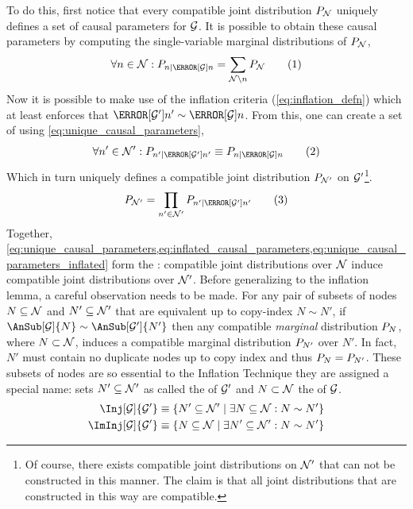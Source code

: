 \documentclass[aps, 10pt, english, twoside, pra, nofootinbib, tightenlines, longbibliography]{revtex4-1}
\begin{document}
    To do this, first notice that every compatible joint distribution $\prob[\nodes]$ uniquely defines a set of causal parameters for $\mathcal{G}$. It is possible to obtain these causal parameters by computing the single-variable marginal distributions of $\prob[\nodes]$,
    \[ \forall n \in \nodes : \prob[n\mid \Pa[\graph]{n}] = \sum_{\nodes \setminus n} \prob[\nodes] \eq \label{eq:unique_causal_parameters}\]
    Now it is possible to make use of the inflation criteria (\cref{eq:inflation_defn}) which at least enforces that $\Pa[\graph']{n'} \sim \Pa[\graph]{n}$. From this, one can create a set of  using \cref{eq:unique_causal_parameters},
    \[ \forall n' \in \nodes' : \prob[n'\mid \Pa[\graph']{n'}] \defined \prob[n\mid \Pa[\graph]{n}] \eq \label{eq:inflated_causal_parameters} \]
    Which in turn uniquely defines a compatible joint distribution $\prob[\nodes']$ on $\mathcal{G}'$\footnote{Of course, there exists compatible joint distributions on $\mathcal{N}'$ that can not be constructed in this manner. The claim is that all joint distributions that are constructed in this way are compatible.}.
    \[ \prob[\nodes'] = \prod_{n' \in \nodes'} \prob[n'\mid \Pa[\graph']{n'}] \eq \label{eq:unique_causal_parameters_inflated}\]
    Together, \cref{eq:unique_causal_parameters,eq:inflated_causal_parameters,eq:unique_causal_parameters_inflated} form the : compatible joint distributions over $\mathcal{N}$ induce compatible joint distributions over $\mathcal{N}'$. Before generalizing to the inflation lemma, a careful observation needs to be made. For any pair of subsets of nodes $N \subseteq \mathcal{N}$ and $N' \subseteq \mathcal{N}'$ that are equivalent up to copy-index $N \sim N'$, if $\AnSub[\graph]{N} \sim \AnSub[\graph']{N'}$ then any compatible \textit{marginal} distribution $\prob[N]$, where $N \subset \mathcal{N}$, induces a compatible marginal distribution $\prob[N']$ over $N'$. In fact, $N'$ must contain no duplicate nodes up to copy index and thus $\prob[N] = \prob[N']$. These subsets of nodes are so essential to the Inflation Technique they are assigned a special name: sets $N' \subseteq \mathcal{N}'$ as called the  of $\mathcal{G}'$ and $N \subset \mathcal{N}$ the  of $\mathcal{G}$.
    \begin{align*}
        \Inj[\graph]{\graph'} &\defined \bc{N' \subseteq \nodes' \mid \exists N \subseteq \nodes : N \sim N'} \\
        \ImInj[\graph]{\graph'} &\defined \bc{N \subseteq \nodes \mid \exists N' \subseteq \nodes' : N \sim N'}
    \end{align*}
\end{document}

